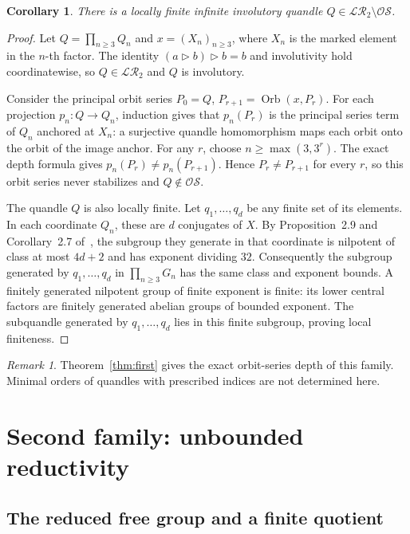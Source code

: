 \documentclass[11pt,a4paper]{article}
\newtheorem{corollary}[theorem]{Corollary}
\theoremstyle{definition}
\theoremstyle{remark}
\newtheorem{remark}[theorem]{Remark}
\newcommand{\LR}{\mathcal{LR}}
\newcommand{\OS}{\mathcal{OS}}
\newcommand{\conj}{\triangleright}
\begin{document}
\begin{corollary}
There is a locally finite infinite involutory quandle
\(Q\in\LR_2\setminus\OS\).
\end{corollary}
\begin{proof}
Let \(Q=\prod_{n\ge3}Q_n\) and \(x=(X_n)_{n\ge3}\), where \(X_n\)
is the marked element in the \(n\)-th factor. The identity
\((a\conj b)\conj b=b\) and involutivity hold coordinatewise, so
\(Q\in\LR_2\) and \(Q\) is involutory.

Consider the principal orbit series \(P_0=Q\),
\(P_{r+1}=\operatorname{Orb}(x,P_r)\). For each projection
\(p_n:Q\to Q_n\), induction gives that \(p_n(P_r)\) is the principal
series term of \(Q_n\) anchored at \(X_n\): a surjective quandle
homomorphism maps each orbit onto the orbit of the image anchor.
For any \(r\), choose \(n\ge\max(3,3^r)\). The exact depth formula gives
\(p_n(P_r)\ne p_n(P_{r+1})\). Hence \(P_r\ne P_{r+1}\) for every \(r\),
so this orbit series never stabilizes and \(Q\notin\OS\).

The quandle \(Q\) is also locally finite. Let \(q_1,\ldots,q_d\)
be any finite set of its elements. In each coordinate \(Q_n\), these
are \(d\) conjugates of \(X\). By Proposition~2.9 and Corollary~2.7
of~\cite{NTT}, the subgroup they generate in that coordinate is
nilpotent of class at most \(4d+2\) and has exponent dividing \(32\).
Consequently the subgroup generated by \(q_1,\ldots,q_d\) in
\(\prod_{n\ge3}G_n\) has the same class and exponent bounds.
A finitely generated nilpotent group of finite exponent is finite:
its lower central factors are finitely generated abelian groups of
bounded exponent. The subquandle generated by \(q_1,\ldots,q_d\) lies
in this finite subgroup, proving local finiteness.
\end{proof}

\begin{remark}
Theorem~\ref{thm:first} gives the exact orbit-series depth of this family.
Minimal orders of quandles with prescribed indices are not determined here.
\end{remark}

\section{Second family: unbounded reductivity}\label{sec:second}

\subsection{The reduced free group and a finite quotient}
\end{document}
